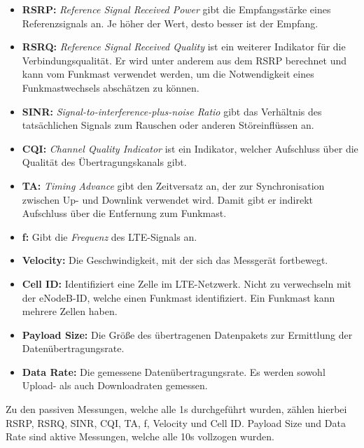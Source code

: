 \begin{itemize}
    \item \textbf{RSRP:} \textit{Reference Signal Received Power} gibt die Empfangsst\"arke eines Referenzsignals an. Je h\"oher der Wert,
        desto besser ist der Empfang.
    \item \textbf{RSRQ:} \textit{Reference Signal Received Quality} ist ein weiterer Indikator f\"ur die Verbindungsqualit\"at.
        Er wird unter anderem aus dem RSRP berechnet und kann vom Funkmast verwendet werden, 
        um die Notwendigkeit eines Funkmastwechsels absch\"atzen zu k\"onnen.
    \item \textbf{SINR:} \textit{Signal-to-interference-plus-noise Ratio} gibt das Verh\"altnis des tats\"achlichen Signals zum Rauschen
        oder anderen St\"oreinfl\"ussen an.
    \item \textbf{CQI:} \textit{Channel Quality Indicator} ist ein Indikator, welcher Aufschluss \"uber die
        Qualit\"at des \"Ubertragungskanals gibt.
    \item \textbf{TA:} \textit{Timing Advance} gibt den Zeitversatz an, der zur Synchronisation zwischen Up- und Downlink
        verwendet wird. Damit gibt er indirekt Aufschluss \"uber die Entfernung zum Funkmast.
    \item \textbf{f:} Gibt die \textit{Frequenz} des LTE-Signals an.
    \item \textbf{Velocity:} Die Geschwindigkeit, mit der sich das Messger\"at fortbewegt.
    \item \textbf{Cell ID:} Identifiziert eine Zelle im LTE-Netzwerk. Nicht zu verwechseln mit der eNodeB-ID, welche einen Funkmast
        identifiziert. Ein Funkmast kann mehrere Zellen haben.
    \item \textbf{Payload Size:} Die Gr\"o{\ss}e des \"ubertragenen Datenpakets zur Ermittlung der Daten\"ubertragungsrate.
    \item \textbf{Data Rate:} Die gemessene Daten\"ubertragungsrate. Es werden sowohl Upload- als auch Downloadraten gemessen.
\end{itemize}
Zu den passiven Messungen, welche alle 1s durchgef\"uhrt wurden, z\"ahlen hierbei RSRP, RSRQ, SINR, CQI, TA, f, Velocity und
Cell ID. Payload Size und Data Rate sind aktive Messungen, welche alle 10s vollzogen wurden.

